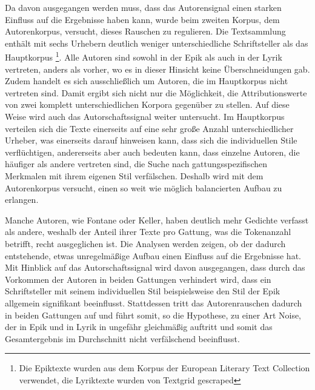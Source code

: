 \documentclass[a4paper,10p]{article}
\begin{document}
Da davon ausgegangen werden muss, dass das Autorensignal einen starken Einfluss auf die Ergebnisse haben kann, wurde beim zweiten Korpus, dem Autorenkorpus, versucht, dieses Rauschen zu regulieren. Die Textsammlung enthält mit sechs Urhebern deutlich weniger unterschiedliche Schriftsteller als das Hauptkorpus \footnote{Die Epiktexte wurden aus dem Korpus der European Literary Text Collection \citep{ELTEC} verwendet, die Lyriktexte wurden von Textgrid \citep{textgrid} gescraped}. Alle Autoren sind sowohl in der Epik als auch in der Lyrik vertreten, anders als vorher, wo es in dieser Hinsicht keine Überschneidungen gab. Zudem handelt es sich ausschließlich um Autoren, die im Hauptkorpus nicht vertreten sind. Damit ergibt sich nicht nur die Möglichkeit, die Attributionswerte von zwei komplett unterschiedlichen Korpora gegenüber zu stellen. Auf diese Weise wird auch das Autorschaftssignal weiter untersucht. Im Hauptkorpus verteilen sich die Texte einerseits auf eine sehr große Anzahl unterschiedlicher Urheber, was einerseits darauf hinweisen kann, dass sich die individuellen Stile verflüchtigen, andererseits aber auch bedeuten kann, dass einzelne Autoren, die häufiger als andere vertreten sind, die Suche nach gattungsspezifischen Merkmalen mit ihrem eigenen Stil verfälschen. Deshalb wird mit dem Autorenkorpus versucht, einen so weit wie möglich balancierten Aufbau zu erlangen. \par 

Manche Autoren, wie Fontane oder Keller, haben deutlich mehr Gedichte verfasst als andere, weshalb der Anteil ihrer Texte pro Gattung, was die Tokenanzahl betrifft, recht ausgeglichen ist. Die Analysen werden zeigen, ob der dadurch entstehende, etwas unregelmäßige Aufbau einen Einfluss auf die Ergebnisse hat. Mit Hinblick auf das Autorschaftssignal wird davon ausgegangen, dass durch das Vorkommen der Autoren in beiden Gattungen verhindert wird, dass ein Schriftsteller mit seinem individuellen Stil beispielsweise den Stil der Epik allgemein signifikant beeinflusst. Stattdessen tritt das Autorenrauschen dadurch in beiden Gattungen auf und führt somit, so die Hypothese, zu einer Art Noise, der in Epik und in Lyrik in ungefähr gleichmäßig auftritt und somit das Gesamtergebnis im Durchschnitt nicht verfälschend beeinflusst. \par 
\end{document}
